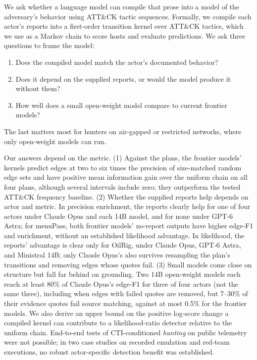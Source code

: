 \documentclass[letterpaper]{article} %
\begin{document}
We ask whether a language model can compile that prose into a model of the adversary's behavior using ATT\&CK tactic sequences. Formally, we compile each actor's reports into a first-order transition kernel over ATT\&CK tactics, which we use as a Markov chain to score hosts and evaluate predictions. We ask three questions to frame the model:
\begin{enumerate}
    \item Does the compiled model match the actor's documented behavior?
    \item Does it depend on the supplied reports, or would the model produce it without them?
    \item How well does a small open-weight model compare to current frontier models?
\end{enumerate}
The last matters most for hunters on air-gapped or restricted networks, where only open-weight models can run.

Our answers depend on the metric. (1) Against the plans, the frontier models' kernels predict edges at two to six times the precision of size-matched random edge sets and have positive mean information gain over the uniform chain on all four plans, although several intervals include zero; they outperform the tested ATT\&CK frequency baseline. (2) Whether the supplied reports help depends on actor and metric. In precision enrichment, the reports clearly help for one of four actors under Claude Opus and each 14B model, and for none under GPT-6 Astra; for menuPass, both frontier models' no-report outputs have higher edge-F1 and enrichment, without an established likelihood advantage. In likelihood, the reports' advantage is clear only for OilRig, under Claude Opus, GPT-6 Astra, and Ministral 14B; only Claude Opus's also survives resampling the plan's transitions and removing edges whose quotes fail. (3) Small models come close on structure but fall far behind on grounding. Two 14B open-weight models each reach at least 80\% of Claude Opus's edge-F1 for three of four actors (not the same three), including when edges with failed quotes are removed, but 7--30\% of their evidence quotes fail source matching, against at most 0.5\% for the frontier models. We also derive an upper bound on the positive log-score change a compiled kernel can contribute to a likelihood-ratio detector relative to the uniform chain. End-to-end tests of CTI-conditioned \emph{hunting} on public telemetry were not possible; in two case studies on recorded emulation and red-team executions, no robust actor-specific detection benefit was established.
\end{document}
